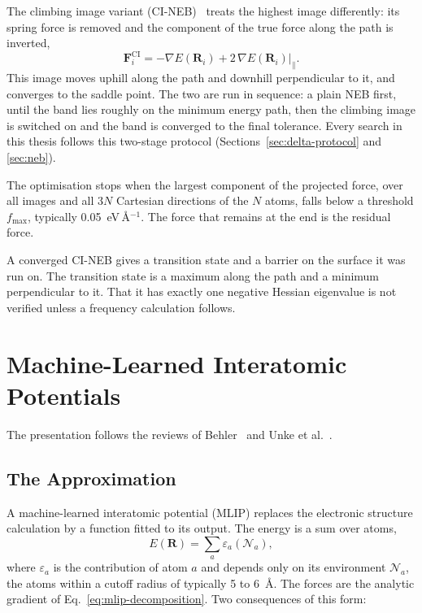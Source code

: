 The climbing image variant (CI-NEB)~\cite{henkelman2000cineb} treats the
highest image differently: its spring force is removed and the component
of the true force along the path is inverted,
%
\begin{equation}
  \mathbf{F}_i^\text{CI} = -\nabla E(\mathbf{R}_i)
  + 2\,\nabla E(\mathbf{R}_i)\big|_\parallel .
\end{equation}
%
This image moves uphill along the path and downhill perpendicular to
it, and converges to the saddle point. The two are run in sequence: a
plain NEB first, until the band lies roughly on the minimum energy
path, then the climbing image is switched on and the band is converged
to the final tolerance. Every search in this thesis follows this
two-stage protocol (Sections~\ref{sec:delta-protocol} and
\ref{sec:neb}).

The optimisation stops when the largest component of the projected force,
over all images and all $3N$ Cartesian directions of the $N$ atoms, falls
below a threshold $f_\text{max}$, typically 0.05~eV\,\AA$^{-1}$. The force
that remains at the end is the residual force.

A converged CI-NEB gives a transition state and a barrier on the surface
it was run on. The transition state is a maximum along the path and a
minimum perpendicular to it. That it has exactly one negative Hessian
eigenvalue is not verified unless a frequency calculation follows.


\section{Machine-Learned Interatomic Potentials}
\label{sec:background-mlip}

The presentation follows the reviews of Behler~\cite{behler2021} and Unke
et al.~\cite{unke2021}.

\subsection{The Approximation}
\label{sec:mlip-approximation}

A machine-learned interatomic potential (MLIP) replaces the electronic
structure calculation by a function fitted to its output. The energy is a
sum over atoms,
%
\begin{equation}
  E(\mathbf{R}) = \sum_a \varepsilon_a(\mathcal{N}_a),
  \label{eq:mlip-decomposition}
\end{equation}
%
where $\varepsilon_a$ is the contribution of atom $a$ and depends only on
its environment $\mathcal{N}_a$, the atoms within a cutoff radius of
typically 5 to 6~\AA. The forces are the analytic gradient of
Eq.~\eqref{eq:mlip-decomposition}. Two consequences of this form:

